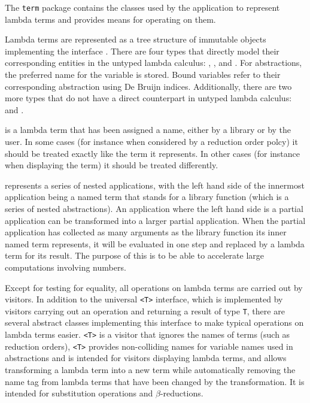 The \texttt{term} package contains the classes used by the application to
represent lambda terms and provides means for operating on them.

Lambda terms are represented as a tree structure of immutable objects
implementing the interface \texttt{}. There are four types that
directly model their corresponding entities in the untyped lambda calculus:
\texttt{}, \texttt{}, \texttt{} and
\texttt{}. For abstractions, the preferred name for the variable is stored.
Bound variables refer to their corresponding abstraction using De Bruijn indices.
Additionally, there are two more types that do not have
a direct counterpart in untyped lambda calculus: \texttt{} and
\texttt{}.

\texttt{} is a lambda term that has been assigned a name, either by a
library or by the user. In some cases (for instance when considered by a
reduction order polcy) it should be treated exactly like the term it
represents. In other cases (for instance when displaying the term) it should be
treated differently.

\texttt{} represents a series of nested applications, with
the left hand side of the innermost application being a named term that stands
for a library function (which is a series of nested abstractions). An
application where the left hand side is a partial application can be
transformed into a larger partial application. When the partial application
has collected as many arguments as the library function its inner named
term represents, it will be evaluated in one step and replaced by a lambda
term for its result. The purpose of this is to be able to accelerate large
computations involving numbers.

Except for testing for equality, all operations on lambda terms are carried out
by visitors. In addition to the universal \texttt{<T>} interface, which
is implemented by visitors carrying out an operation and returning a result of type
\texttt{T}, there are several abstract classes implementing this interface to make
typical operations on lambda terms easier. \texttt{<T>} is a
visitor that ignores the names of terms (such as reduction orders),
\texttt{<T>} provides non-colliding names for variable names
used in abstractions and is intended for visitors displaying lambda terms, and
\texttt{} allows transforming a lambda term into a new term while
automatically removing the name tag from lambda terms that have been changed by
the transformation. It is intended for substitution operations and $\beta$-reductions.
